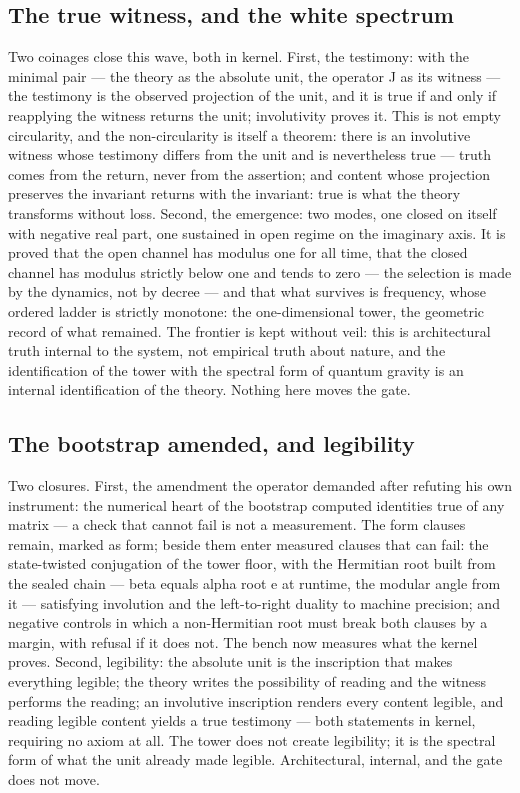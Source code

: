 \documentclass[11pt]{article}
\theoremstyle{definition}\newtheorem{deriv}{Derivation}
\begin{document}
\subsection*{The true witness, and the white spectrum}Two coinages close this wave, both in kernel. First, the testimony: with the minimal pair --- the theory as the absolute unit, the operator J as its witness --- the testimony is the observed projection of the unit, and it is true if and only if reapplying the witness returns the unit; involutivity proves it. This is not empty circularity, and the non-circularity is itself a theorem: there is an involutive witness whose testimony differs from the unit and is nevertheless true --- truth comes from the return, never from the assertion; and content whose projection preserves the invariant returns with the invariant: true is what the theory transforms without loss. Second, the emergence: two modes, one closed on itself with negative real part, one sustained in open regime on the imaginary axis. It is proved that the open channel has modulus one for all time, that the closed channel has modulus strictly below one and tends to zero --- the selection is made by the dynamics, not by decree --- and that what survives is frequency, whose ordered ladder is strictly monotone: the one-dimensional tower, the geometric record of what remained. The frontier is kept without veil: this is architectural truth internal to the system, not empirical truth about nature, and the identification of the tower with the spectral form of quantum gravity is an internal identification of the theory. Nothing here moves the gate.

\subsection*{The bootstrap amended, and legibility}Two closures. First, the amendment the operator demanded after refuting his own instrument: the numerical heart of the bootstrap computed identities true of any matrix --- a check that cannot fail is not a measurement. The form clauses remain, marked as form; beside them enter measured clauses that can fail: the state-twisted conjugation of the tower floor, with the Hermitian root built from the sealed chain --- beta equals alpha root e at runtime, the modular angle from it --- satisfying involution and the left-to-right duality to machine precision; and negative controls in which a non-Hermitian root must break both clauses by a margin, with refusal if it does not. The bench now measures what the kernel proves. Second, legibility: the absolute unit is the inscription that makes everything legible; the theory writes the possibility of reading and the witness performs the reading; an involutive inscription renders every content legible, and reading legible content yields a true testimony --- both statements in kernel, requiring no axiom at all. The tower does not create legibility; it is the spectral form of what the unit already made legible. Architectural, internal, and the gate does not move.
\end{document}
